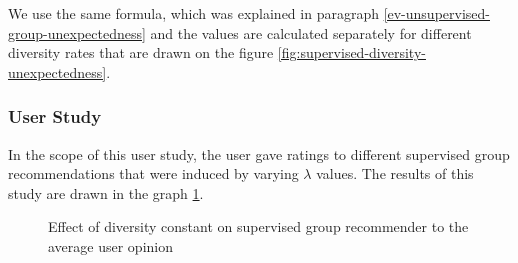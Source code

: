 We use the same formula, which was explained in paragraph \ref{ev-unsupervised-group-unexpectedness} and the values are calculated separately for different diversity rates that are drawn on the figure \ref{fig:supervised-diversity-unexpectedness}.


\subsubsection{User Study}

In the scope of this user study, the user gave ratings to different supervised group recommendations that were induced by varying $\lambda$ values. The results of this study are drawn in the graph \ref{fig:supervised-diversity-user-study}.

\begin{figure}[ht]
	\centering
	
	\exampleA
	\exampleB
	\exampleC
	\caption[Supervised diverse user study figure]{Effect of diversity constant on supervised group recommender to the average user opinion}\label{fig:supervised-diversity-user-study}
\end{figure}

